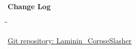 \documentclass[letterpaper]{article}
\begin{document}
\begin{titlepage}
\begin{center}
\end{center}
\vfill %

\end{titlepage}
	\newpage
	{\LARGE \bf Change Log}\\[2em]
	
	\begin{tabbing}
		\hspace*{2.5cm}\=\hspace*{2.5cm}\=\hspace*{8cm}\=\hspace*{3cm} \kill
		
	\end{tabbing}
	
		\newpage
		\renewcommand\contentsname{TABLE OF CONTENTS}
		\newcommand\contentsnameLC{\colorbox{black}{\makebox[\textwidth-2\fboxsep][l]{\bfseries\color{red} Table of Contents}}}
		
		\renewcommand{\cftdot}{}
		\hypersetup{linktocpage}
		\tableofcontents
		
		\begin{flushleft}
			\LARGE\href{https://github.com/njTaljaard/Laminin_CorpseSlasher/}{Git repository: Laminin\_CorpseSlasher}
		\end{flushleft}
		
	\newpage
		\section*{\colorbox{black}{}} 
	\vspace{0.1in}
	
\end{document}
